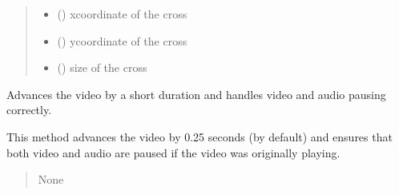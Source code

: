 \documentclass[letterpaper,10pt,english]{sphinxmanual}
\begin{document}
\begin{fulllineitems}
\begin{fulllineitems}
\begin{quote}
\begin{description}
\begin{itemize}
\item {} 
\sphinxAtStartPar
{} () \textendash{} x\sphinxhyphen{}coordinate of the cross

\item {} 
\sphinxAtStartPar
{} () \textendash{} y\sphinxhyphen{}coordinate of the cross

\item {} 
\sphinxAtStartPar
{} () \textendash{} size of the cross

\end{itemize}

\end{description}\end{quote}

\end{fulllineitems}


\begin{fulllineitems}
\label{\detokenize{general_interface:general_interface.LecteurVideo.avance_progress}}
\pysigstartsignatures
{}
\pysigstopsignatures
\sphinxAtStartPar
Advances the video by a short duration and handles video and audio pausing correctly.

\sphinxAtStartPar
This method advances the video by 0.25 seconds (by default) and ensures that both video
and audio are paused if the video was originally playing.
\begin{quote}\begin{description}
\sphinxAtStartPar
{} \textendash{} 

\sphinxAtStartPar
None

\sphinxAtStartPar
{} \textendash{} 

\end{description}\end{quote}

\end{fulllineitems}


\end{fulllineitems}
\end{document}
